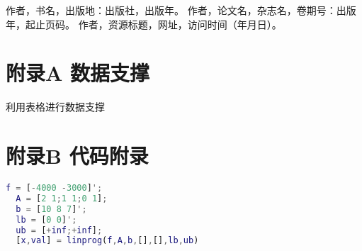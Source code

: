 \documentclass[12pt,a4paper]{article}
\begin{document}
\newpage
\begin{thebibliography}{99}
\songti
{} 作者，书名，出版地：出版社，出版年。
 作者，论文名，杂志名，卷期号：出版年，起止页码。
 作者，资源标题，网址，访问时间（年月日）。
\end{thebibliography}

\newpage
\section*{附录A 数据支撑}
利用表格进行数据支撑
\section*{附录B 代码附录}
\begin{lstlisting}[language=Matlab]
  f = [-4000 -3000]';
  A = [2 1;1 1;0 1];
  b = [10 8 7]';
  lb = [0 0]';
  ub = [+inf;+inf];
  [x,val] = linprog(f,A,b,[],[],lb,ub)
  \end{lstlisting}
\end{document}
